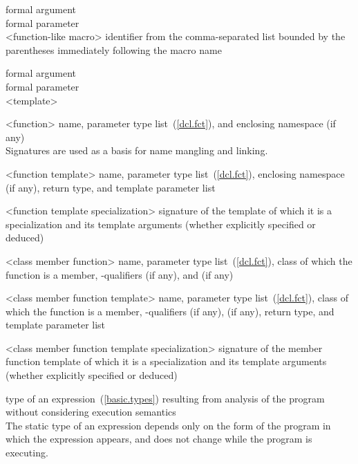 %
%
formal argument\\
formal parameter\\
<function-like macro> identifier from
the comma-separated list bounded by the parentheses immediately
following the macro name

%
%
formal argument\\
formal parameter\\
<template> 

%
<function> name, parameter type list~(\ref{dcl.fct}), and enclosing namespace (if any)\\
\enternote Signatures are used as a basis for
name mangling and linking.\exitnote

%
<function template> name, parameter type list~(\ref{dcl.fct}), enclosing namespace (if any),
return type, and template parameter list

%
<function template specialization> signature of the template of which it is a specialization
and its template arguments (whether explicitly specified or deduced)

%
<class member function> name, parameter type list~(\ref{dcl.fct}), class of which the
function is a member, \cv-qualifiers (if any),
and  (if any)

%
<class member function template> name, parameter type list~(\ref{dcl.fct}), class of which the
function is a member, \cv-qualifiers (if any),
 (if any), return type, and template parameter list

%
<class member function template specialization> signature of the member function template
of which it is a specialization and its template arguments (whether explicitly specified or deduced)

%
type of an expression~(\ref{basic.types}) resulting from
analysis of the program without considering execution semantics\\
\enternote The
static type of an expression depends only on the form of the program in
which the expression appears, and does not change while the program is
executing. \exitnote

